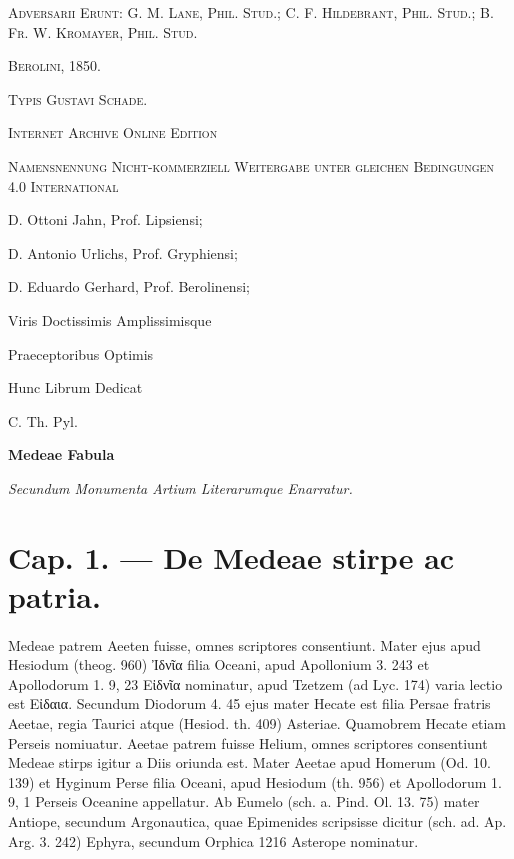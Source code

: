 \documentclass[a4paper, 11pt, oneside, polutonikogreek, german]{article}
\begin{document}
\begin{titlepage}
	\vspace*{1\baselineskip} %

        {\scshape \scriptsize Adversarii Erunt: G. M. Lane, Phil. Stud.; C. F. Hildebrant, Phil. Stud.; B. Fr. W. Kromayer, Phil. Stud.}
        \vspace*{\fill}

	\vspace{1\baselineskip}

	{\small\scshape Berolini, 1850.}
	
	{\small\scshape{Typis Gustavi Schade.}}
	
	\vspace{0.5\baselineskip} %

        \scshape Internet Archive Online Edition%
	
	{\scshape\small Namensnennung Nicht-kommerziell Weitergabe unter gleichen Bedingungen 4.0 International} %
\end{titlepage}
\setlength{\parskip}{1mm plus1mm minus1mm}
\clearpage
\tableofcontents
\clearpage
\vspace*{\fill}

D. Ottoni Jahn, Prof. Lipsiensi;

D. Antonio Urlichs, Prof. Gryphiensi;

D. Eduardo Gerhard, Prof. Berolinensi;

Viris Doctissimis Amplissimisque

Praeceptoribus Optimis

Hunc Librum Dedicat

C. Th. Pyl.
\vspace*{\fill}
\clearpage
\begin{center}
\textbf{Medeae Fabula}

\emph{Secundum Monumenta Artium Literarumque Enarratur.}
\end{center}
\section{Cap. 1. --- De Medeae stirpe ac patria.}
\paragraph{}
Medeae patrem Aeeten fuisse, omnes scriptores consentiunt. Mater ejus apud Hesiodum (theog. 960) Ἰδνῖα filia Oceani, apud Apollonium 3. 243 et Apollodorum 1. 9, 23 Εἰδνῖα nominatur, apud Tzetzem (ad Lyc. 174) varia lectio est Εἰδαια. Secundum Diodorum 4. 45 ejus mater Hecate est filia Persae fratris Aeetae, regia Taurici atque (Hesiod. th. 409) Asteriae. Quamobrem Hecate etiam Perseis nomiuatur. Aeetae patrem fuisse Helium, omnes scriptores consentiunt Medeae stirps igitur a Diis oriunda est. Mater Aeetae apud Homerum (Od. 10. 139) et Hyginum Perse filia Oceani, apud Hesiodum (th. 956) et Apollodorum 1. 9, 1 Perseis Oceanine appellatur. Ab Eumelo (sch. a. Pind. Ol. 13. 75) mater Antiope, secundum Argonautica, quae Epimenides scripsisse dicitur (sch. ad. Ap. Arg. 3. 242) Ephyra, secundum Orphica 1216 Asterope nominatur.
\end{document}
